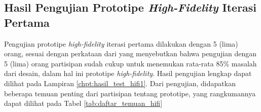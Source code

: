 \subsection{Hasil Pengujian Prototipe \textit{High-Fidelity} Iterasi Pertama}
\label{subsec:hasil_test_1}

Pengujian prototipe \textit{high-fidelity} iterasi pertama dilakukan dengan 5 (lima) orang, sesuai dengan perkataan dari \textcite{nielsenusabilityproblems} yang menyebutkan bahwa pengujian dengan 5 (lima) orang partisipan sudah cukup untuk menemukan rata-rata 85\% masalah dari desain, dalam hal ini prototipe \textit{high-fidelity}. Hasil pengujian lengkap dapat dilihat pada Lampiran \ref{chpt:hasil_test_hifi1}. Dari pengujian, didapatkan beberapa temuan penting dari partisipan tentang prototipe, yang rangkumannya dapat dilihat pada Tabel \ref{tab:daftar_temuan_hifi}


